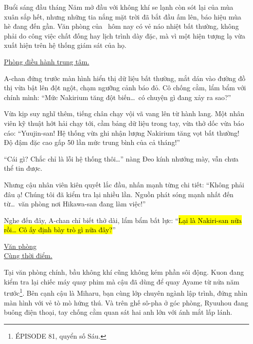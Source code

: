 \documentclass[../main.tex]{subfiles}
\begin{document}

Buổi sáng đầu tháng Năm mở đầu với không khí se lạnh còn sót lại của mùa xuân sắp hết, nhưng những tia nắng mặt trời đã bắt đầu ấm lên, báo hiệu mùa hè đang đến gần. Văn phòng của \hll\ hôm nay có vẻ náo nhiệt bất thường, không phải do công việc chất đống hay lịch trình dày đặc, mà vì một hiện tượng lạ vừa xuất hiện trên hệ thống giám sát của họ.

\begin{center}
  \uline{Phòng điều hành trung tâm.}
\end{center}

A-chan đứng trước màn hình hiển thị dữ liệu bất thường, mắt dán vào đường đồ thị vừa bật lên đột ngột, chạm ngưỡng cảnh báo đỏ. Cô chống cằm, lẩm bẩm với chính mình: ``Mức Nakirium tăng đột biến\dots\ có chuyện gì đang xảy ra sao?''

Vừa kịp suy nghĩ thêm, tiếng chân chạy vội vã vang lên từ hành lang. Một nhân viên kỹ thuật hớt hải chạy tới, cầm bảng dữ liệu trong tay, vừa thở dốc vừa báo cáo: ``Yuujin-san! Hệ thống vừa ghi nhận lượng Nakirium tăng vọt bất thường! Độ đậm đặc cao gấp 50 lần mức trung bình của cả tháng!''

``Cái gì? Chắc chỉ là lỗi hệ thống thôi\dots'' nàng Đeo kính nhướng mày, vẫn chưa thể tin được.

Nhưng cậu nhân viên kiên quyết lắc đầu, nhấn mạnh từng chi tiết: ``Không phải đâu ạ! Chúng tôi đã kiểm tra lại nhiều lần. Nguồn phát sóng mạnh nhất đến từ\dots\ văn phòng nơi Hikawa-san đang làm việc!''

Nghe đến đây, A-chan chỉ biết thở dài, lẩm bẩm bất lực: ``\hl{Lại là Nakiri-san nữa rồi\dots{} Cô ấy định bày trò gì nữa đây?}''

\begin{center}
  \uline{Văn phòng\\Cùng thời điểm.}
\end{center}

Tại văn phòng chính, bầu không khí cũng không kém phần sôi động. Kuon đang kiểm tra lại chiếc máy quay phim mà cậu đã dùng để quay Ayame từ nửa năm trước\footnote{{\flaregothic ÉPISODE 81}, quyển số Sáu.}. Bên cạnh cậu là Miharu, bạn cùng lớp chuyên ngành lập trình, đứng nhìn màn hình với vẻ tò mò hứng thú. Và trên ghế sô-pha ở góc phòng, Ryuuhou đang buông điện thoại, tay chống cằm quan sát hai anh lớn với ánh mắt lấp lánh.
\end{document}
